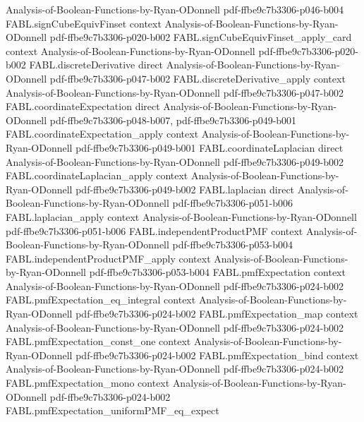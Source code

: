 \begin{theorem}
  {Analysis-of-Boolean-Functions-by-Ryan-ODonnell}
  {pdf-ffbe9c7b3306-p046-b004}
\proofstep
  {FABL.signCubeEquivFinset}
  {context}
  {Analysis-of-Boolean-Functions-by-Ryan-ODonnell}
  {pdf-ffbe9c7b3306-p020-b002}
\proofstep
  {FABL.signCubeEquivFinset_apply_card}
  {context}
  {Analysis-of-Boolean-Functions-by-Ryan-ODonnell}
  {pdf-ffbe9c7b3306-p020-b002}
\proofstep
  {FABL.discreteDerivative}
  {direct}
  {Analysis-of-Boolean-Functions-by-Ryan-ODonnell}
  {pdf-ffbe9c7b3306-p047-b002}
\proofstep
  {FABL.discreteDerivative_apply}
  {context}
  {Analysis-of-Boolean-Functions-by-Ryan-ODonnell}
  {pdf-ffbe9c7b3306-p047-b002}
\proofstep
  {FABL.coordinateExpectation}
  {direct}
  {Analysis-of-Boolean-Functions-by-Ryan-ODonnell}
  {pdf-ffbe9c7b3306-p048-b007,
    pdf-ffbe9c7b3306-p049-b001}
\proofstep
  {FABL.coordinateExpectation_apply}
  {context}
  {Analysis-of-Boolean-Functions-by-Ryan-ODonnell}
  {pdf-ffbe9c7b3306-p049-b001}
\proofstep
  {FABL.coordinateLaplacian}
  {direct}
  {Analysis-of-Boolean-Functions-by-Ryan-ODonnell}
  {pdf-ffbe9c7b3306-p049-b002}
\proofstep
  {FABL.coordinateLaplacian_apply}
  {context}
  {Analysis-of-Boolean-Functions-by-Ryan-ODonnell}
  {pdf-ffbe9c7b3306-p049-b002}
\proofstep
  {FABL.laplacian}
  {direct}
  {Analysis-of-Boolean-Functions-by-Ryan-ODonnell}
  {pdf-ffbe9c7b3306-p051-b006}
\proofstep
  {FABL.laplacian_apply}
  {context}
  {Analysis-of-Boolean-Functions-by-Ryan-ODonnell}
  {pdf-ffbe9c7b3306-p051-b006}
\proofstep
  {FABL.independentProductPMF}
  {context}
  {Analysis-of-Boolean-Functions-by-Ryan-ODonnell}
  {pdf-ffbe9c7b3306-p053-b004}
\proofstep
  {FABL.independentProductPMF_apply}
  {context}
  {Analysis-of-Boolean-Functions-by-Ryan-ODonnell}
  {pdf-ffbe9c7b3306-p053-b004}
\proofstep
  {FABL.pmfExpectation}
  {context}
  {Analysis-of-Boolean-Functions-by-Ryan-ODonnell}
  {pdf-ffbe9c7b3306-p024-b002}
\proofstep
  {FABL.pmfExpectation_eq_integral}
  {context}
  {Analysis-of-Boolean-Functions-by-Ryan-ODonnell}
  {pdf-ffbe9c7b3306-p024-b002}
\proofstep
  {FABL.pmfExpectation_map}
  {context}
  {Analysis-of-Boolean-Functions-by-Ryan-ODonnell}
  {pdf-ffbe9c7b3306-p024-b002}
\proofstep
  {FABL.pmfExpectation_const_one}
  {context}
  {Analysis-of-Boolean-Functions-by-Ryan-ODonnell}
  {pdf-ffbe9c7b3306-p024-b002}
\proofstep
  {FABL.pmfExpectation_bind}
  {context}
  {Analysis-of-Boolean-Functions-by-Ryan-ODonnell}
  {pdf-ffbe9c7b3306-p024-b002}
\proofstep
  {FABL.pmfExpectation_mono}
  {context}
  {Analysis-of-Boolean-Functions-by-Ryan-ODonnell}
  {pdf-ffbe9c7b3306-p024-b002}
\proofstep
  {FABL.pmfExpectation_uniformPMF_eq_expect}

\end{theorem}
